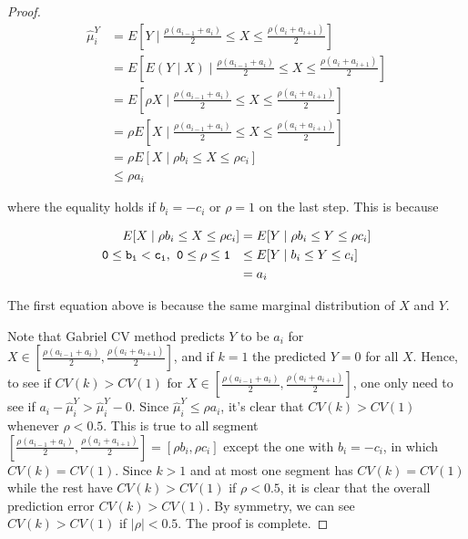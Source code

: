 \documentclass[12pt]{article}
\begin{document}
\begin{proof}
\begin{align*}
	\hat{\mu}^Y_i &= E[Y \mid \frac{\rho \left( a_{i-1}+a_i\right)}{2} \leq X \leq \frac{\rho \left( a_{i}+a_{i+1}\right)}{2}] \\
	 &= E[ E(Y \mid X) \mid \frac{\rho \left( a_{i-1}+a_i\right)}{2} \leq X \leq \frac{\rho \left( a_{i}+a_{i+1}\right)}{2}] \\
	 &= E[ \rho X \mid \frac{\rho \left( a_{i-1}+a_i\right)}{2} \leq X \leq \frac{\rho \left( a_{i}+a_{i+1}\right)}{2}] \\
	 & =  \rho E[X \mid \frac{\rho \left( a_{i-1}+a_i\right)}{2} \leq X \leq \frac{\rho \left( a_{i}+a_{i+1}\right)}{2}] \\
	  & =  \rho E[X \mid \rho b_i \leq X \leq \rho c_i] \\
	  &\leq \rho a_i
\end{align*}

where the equality holds if $b_i = -c_i$ or $\rho = 1$ on the last step. This is because 

\begin{align*}
	 E[X \mid \rho b_i \leq X \leq \rho c_i] &= E[Y \mid \rho b_i \leq Y \leq \rho c_i] \\
	\mathtt{0 \leq b_i < c_i}, \hspace{0.05in} \mathtt{0 \leq \rho \leq 1} \hspace{0.1in} & \leq E[Y \mid b_i \leq Y \leq c_i] \\
	&= a_i
\end{align*}

The first equation above is because the same marginal distribution of $X$ and $Y$.  

Note that Gabriel CV method predicts $Y$ to be $a_i$ for $X \in [\frac{\rho \left( a_{i-1}+a_i\right)}{2}, \frac{\rho \left( a_{i}+a_{i+1}\right)}{2}]$, and if $k=1$ the predicted $Y = 0$ for all $X$. Hence, to see if $CV(k) > CV(1)$ for  $X \in [\frac{\rho \left( a_{i-1}+a_i\right)}{2}, \frac{\rho \left( a_{i}+a_{i+1}\right)}{2}]$, one only need to see if $ a_i-\hat{\mu}^Y_i > \hat{\mu}^Y_i - 0$. Since $ \hat{\mu}^Y_i \leq \rho a_i$, it's clear that $CV(k) > CV(1)$ whenever $\rho < 0.5$. This is true to all segment $[\frac{\rho \left( a_{i-1}+a_i\right)}{2}, \frac{\rho \left( a_{i}+a_{i+1}\right)}{2}] = [\rho b_i, \rho c_i]$ except the one with $b_i = -c_i$, in which $CV(k) = CV(1)$. Since $k>1$ and at most one segment has $CV(k) = CV(1)$ while the rest have $CV(k) > CV(1)$ if $\rho < 0.5$, it is clear that the overall prediction error $CV(k) > CV(1)$. By symmetry, we can see $CV(k) > CV(1)$ if $|\rho| < 0.5$. The proof is complete.
\end{proof}
\end{document}
